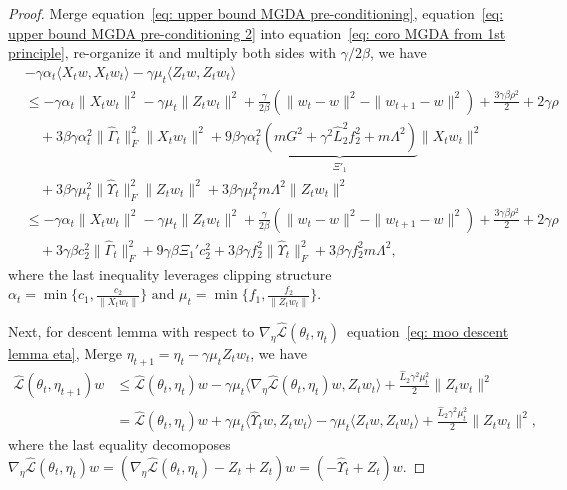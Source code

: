\documentclass[twoside]{article} %
\def\eqref#1{equation~\ref{#1}}
\theoremstyle{plain}
\theoremstyle{definition}
\theoremstyle{remark}
\newcommand{\HGamma}{\hat{\Gamma}}
\newcommand{\HUpsilon}{\hat{\Upsilon}}
\newcommand{\hL}{\hat{L}}
\newcommand{\fhL}{\hat{\mathcal{L}}}
\begin{document}
\begin{proof}
Merge \eqref{eq: upper bound MGDA pre-conditioning}, \eqref{eq: upper bound MGDA pre-conditioning 2} into \eqref{eq: coro MGDA from 1st principle}, re-organize it and multiply both sides with $\gamma/2\beta$, we have
\begin{align}
    &-\gamma\alpha_t\langle X_t{w},X_t{w}_t \rangle -\gamma{\mu_t}\langle{Z}_tw, Z_tw_t \rangle\nonumber \\
    &\leq -\gamma\alpha_t \|X_tw_t\|^2-\gamma\mu_t\| Z_tw_t\|^2+\frac{\gamma}{2\beta}(\|w_t-w\|^2-\|w_{t+1}-w\|^2)+\frac{3\gamma\beta\rho^2}{2}+2\gamma\rho\nonumber\\
    &\quad +3\beta\gamma\alpha_t^2 \|\HGamma_{t}\|_F^2 \|X_t w_t\|^2+9\beta\gamma\alpha_t^2\underbrace{(mG^2+\gamma^2\hL_2^2{f_2^2}+m\Lambda^2)}_{\Xi'_1}\|X_tw_t\|^2\nonumber\\
    &\quad+ 3\beta\gamma\mu_t^2\| {\HUpsilon}_t\|^2_F\|Z_tw_t\|^2+3\beta\gamma\mu_t^2m\Lambda^2\|Z_tw_t\|^2\nonumber\\
    &\leq-\gamma\alpha_t \|X_tw_t\|^2-\gamma\mu_t\| Z_tw_t\|^2+\frac{\gamma}{2\beta}(\|w_t-w\|^2-\|w_{t+1}-w\|^2)+\frac{3\gamma\beta\rho^2}{2}+2\gamma\rho \nonumber\\
    &\quad+ 3\gamma\beta c_2^2\|\HGamma_t\|_F^2 + 9\gamma\beta\Xi_1'c_2^2 + 3\beta\gamma{f_2^2}\|\HUpsilon_t\|_F^2+3\beta\gamma{f_2^2}m\Lambda^2,
    \label{eq: coro MDGA}
\end{align}
where the last inequality leverages clipping structure $\alpha_t = \min\{c_1,\frac{c_2}{\|X_tw_t\|} \} \text{ and }\mu_t = \min\{f_1,\frac{f_2}{\|Z_tw_t\|} \}$.

Next, for descent lemma with respect to $\nabla_{\eta}\fhL(\theta_t, \eta_t)$~\eqref{eq: moo descent lemma eta}, Merge $\eta_{t+1}=\eta_t-\gamma\mu_tZ_tw_t$, we have
\begin{align}
    \fhL(\theta_t,\eta_{t+1})w
    &\leq \fhL(\theta_t, \eta_t)w - {\gamma\mu_t} \langle \nabla_{\eta}\fhL(\theta_t, \eta_t)w,Z_tw_t \rangle + \frac{\hL_2{\gamma^2\mu_t^2}}{2}\|Z_tw_t\|^2\nonumber\\
    &=\fhL(\theta_t, \eta_t)w +{\gamma\mu_t} \langle{\HUpsilon}_tw,Z_tw_t\rangle-{\gamma\mu_t}\langle{Z}_tw,Z_tw_t \rangle + \frac{\hL_2\gamma^2\mu_t^2}{2}\|Z_tw_t\|^2,
    \label{eq: coro descent 1}
\end{align}
where the last equality decomoposes $\nabla_{\eta}\fhL(\theta_t,\eta_t)w=(\nabla_{\eta}\fhL(\theta_t,\eta_t)-Z_t+Z_t)w = (-\HUpsilon_t+Z_t)w$.


\end{proof}
\end{document}
